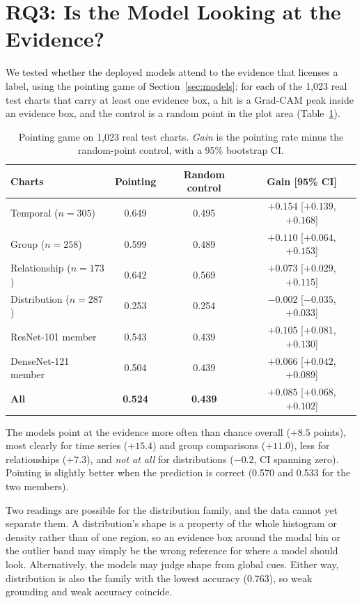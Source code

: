 \section{RQ3: Is the Model Looking at the Evidence?}
\label{sec:rq3}

We tested whether the deployed models attend to the evidence that licenses a label,
using the pointing game of Section~\ref{sec:models}: for each of the 1{,}023 real test
charts that carry at least one evidence box, a hit is a Grad-CAM peak inside an evidence
box, and the control is a random point in the plot area (Table~\ref{tab:grounding}).

\begin{table}[h]\centering\small
\caption{Pointing game on 1{,}023 real test charts. \emph{Gain} is the pointing rate
minus the random-point control, with a 95\% bootstrap CI.}
\label{tab:grounding}
\begin{tabular}{lccc}
\toprule
\textbf{Charts} & \textbf{Pointing} & \textbf{Random control} & \textbf{Gain [95\% CI]} \\
\midrule
Temporal ($n=305$)      & 0.649 & 0.495 & $+0.154$ [$+0.139$, $+0.168$] \\
Group ($n=258$)         & 0.599 & 0.489 & $+0.110$ [$+0.064$, $+0.153$] \\
Relationship ($n=173$)  & 0.642 & 0.569 & $+0.073$ [$+0.029$, $+0.115$] \\
Distribution ($n=287$)  & 0.253 & 0.254 & $-0.002$ [$-0.035$, $+0.033$] \\
\midrule
ResNet-101 member       & 0.543 & 0.439 & $+0.105$ [$+0.081$, $+0.130$] \\
DenseNet-121 member     & 0.504 & 0.439 & $+0.066$ [$+0.042$, $+0.089$] \\
\textbf{All}            & \textbf{0.524} & \textbf{0.439} & $\mathbf{+0.085}$ [$+0.068$, $+0.102$] \\
\bottomrule
\end{tabular}
\end{table}

The models point at the evidence more often than chance overall ($+8.5$ points), most
clearly for time series ($+15.4$) and group comparisons ($+11.0$), less for relationships
($+7.3$), and \emph{not at all} for distributions ($-0.2$, CI spanning zero). Pointing is
slightly better when the prediction is correct (0.570 and 0.533 for the two members).

Two readings are possible for the distribution family, and the data cannot yet separate
them. A distribution's shape is a property of the whole histogram or density rather than
of one region, so an evidence box around the modal bin or the outlier band may simply be
the wrong reference for where a model should look. Alternatively, the models may judge
shape from global cues. Either way, distribution is also the family with the lowest
accuracy (0.763), so weak grounding and weak accuracy coincide.

